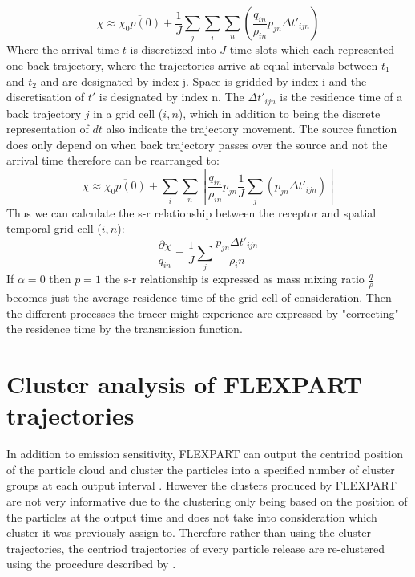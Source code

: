 \begin{equation}\label{eq:discrete_mix_ratio}
    \chi \approx \overline{\chi_0p(0)} + \frac{1}{J} \sum_j \sum_i \sum_n \left(\frac{q_{in}}{\rho_{in}}p_{jn}\Delta t'_{ijn}\right)
\end{equation}
Where the arrival time $t$ is discretized into $J$ time slots which each represented one back trajectory, where the trajectories arrive at equal intervals between $t_1$ and $t_2$ and are designated by index j. Space is gridded by index i and the discretisation of $t'$ is designated by index n. The $\Delta t'_{ijn}$ is the residence time of a back trajectory $j$ in a grid cell ($i,n$), which in addition to being the discrete representation of $dt$ also indicate the trajectory movement. The source function does only depend on when back trajectory passes over the source and not the arrival time therefore  can be rearranged to:
\begin{equation}
    \chi \approx \overline{\chi_0p(0)} + \sum_i \sum_n \left[\frac{q_{in}}{\rho_{in}}p_{jn} \frac{1}{J}\sum_j (p_{jn}\Delta t'_{ijn})\right]
\end{equation}
Thus we can calculate the s-r relationship between the receptor and spatial temporal grid cell ($i,n$):
\begin{equation}
    \frac{\partial \overline{\chi}}{q_{in}} = \frac{1}{J} \sum_j \frac{p_{jn} \Delta t'_{ijn}}{\rho_in}
\end{equation}
If $\alpha=0$ then $p=1$ the s-r relationship is expressed as mass mixing ratio $\frac{q}{\rho}$ becomes just the average residence time of the grid cell of consideration. Then the different processes the tracer might experience are expressed by "correcting" the residence time by the transmission function. 


\chapter{Cluster analysis of FLEXPART trajectories}\label{chap:trajec_analysis}

In addition to emission sensitivity, FLEXPART can output the centriod position of the particle cloud and cluster the particles into a specified number of cluster groups at each output interval \parencite{stohl_replacement_2002}. However the clusters produced by FLEXPART are not very informative due to the clustering only being based on the position of the particles at the output time and does not take into consideration which cluster it was previously assign to. Therefore rather than using the cluster trajectories, the centriod trajectories of every particle release are re-clustered using the procedure described by \textcite{dorling1992cluster}. 

